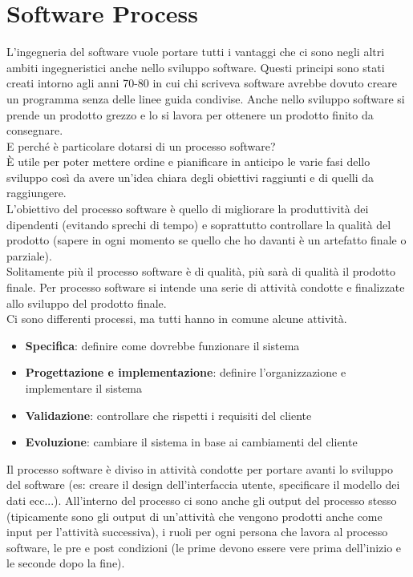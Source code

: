 \section{Software Process}
\label{sec:02_software_process}
L'ingegneria del software vuole portare tutti i vantaggi che ci sono negli altri ambiti ingegneristici anche nello sviluppo software.
Questi principi sono stati creati intorno agli anni 70-80 in cui chi scriveva software avrebbe dovuto creare un programma senza delle linee guida condivise.
Anche nello sviluppo software si prende un prodotto grezzo e lo si lavora per ottenere un prodotto finito da consegnare.\\
E perché è particolare dotarsi di un processo software?\\
È utile per poter mettere ordine e pianificare in anticipo le varie fasi dello sviluppo così da avere un'idea chiara degli obiettivi raggiunti e di quelli da raggiungere.\\
L'obiettivo del processo software è quello di migliorare la produttività dei dipendenti (evitando sprechi di tempo) e soprattutto controllare la qualità del prodotto (sapere in ogni momento se quello che ho davanti è un artefatto finale o parziale).\\
Solitamente più il processo software è di qualità, più sarà di qualità il prodotto finale.
Per processo software si intende una serie di attività condotte e finalizzate allo sviluppo del prodotto finale.\\
Ci sono differenti processi, ma tutti hanno in comune alcune attività.
\begin{itemize}[noitemsep]
    \item \textbf{Specifica}: definire come dovrebbe funzionare il sistema
    \item \textbf{Progettazione e implementazione}: definire l'organizzazione e implementare il sistema
    \item \textbf{Validazione}: controllare che rispetti i requisiti del cliente
    \item \textbf{Evoluzione}: cambiare il sistema in base ai cambiamenti del cliente
\end{itemize}
Il processo software è diviso in attività condotte per portare avanti lo sviluppo del software (es: creare il design dell'interfaccia utente, specificare il modello dei dati ecc...).
All'interno del processo ci sono anche gli output del processo stesso (tipicamente sono gli output di un'attività che vengono prodotti anche come input per l'attività successiva), i ruoli per ogni persona che lavora al processo software, le pre e post condizioni (le prime devono essere vere prima dell'inizio e le seconde dopo la fine).\\
